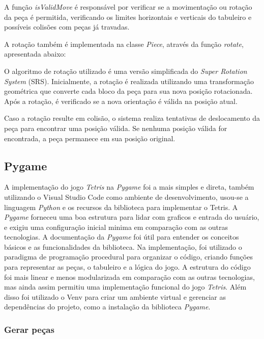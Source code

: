 A função \textit{isValidMove} é responsável por verificar se a movimentação ou rotação da peça é permitida, verificando os limites horizontais e verticais do tabuleiro e possíveis colisões com peças já travadas.

A rotação também é implementada na classe \textit{Piece}, através da função \textit{rotate}, apresentada abaixo:



O algoritmo de rotação utilizado é uma versão simplificada do \textit{Super Rotation System} (SRS). Inicialmente, a rotação é realizada utilizando uma transformação geométrica que converte cada bloco da peça para sua nova posição rotacionada. Após a rotação, é verificado se a nova orientação é válida na posição atual.

Caso a rotação resulte em colisão, o sistema realiza tentativas de deslocamento da peça para encontrar uma posição válida. Se nenhuma posição válida for encontrada, a peça permanece em sua posição original.


\subsection{Pygame}

A implementação do jogo \textit{Tetris} na \textit{Pygame} foi a mais simples e direta, também utilizando o Visual Studio Code como ambiente de desenvolvimento, usou-se a linguagem \textit{Python} e os recursos da biblioteca para implementar o Tetris. A \textit{Pygame} forneceu uma boa estrutura para lidar com graficos e entrada do usuário, e exigiu uma configuração inicial minima em comparação com as outras tecnologias. A documentação da \textit{Pygame} foi útil para entender os conceitos básicos e as funcionalidades da biblioteca.
Na implementação, foi utilizado o paradigma de programação procedural para organizar o código, criando funções para representar as peças, o tabuleiro e a lógica do jogo. A estrutura do código foi mais linear e menos modularizada em comparação com as outras tecnologias, mas ainda assim permitiu uma implementação funcional do jogo \textit{Tetris}.
Além disso foi utilizado o Venv para criar um ambiente virtual e gerenciar as dependências do projeto, como a instalação da biblioteca \textit{Pygame}.

\subsubsection{Gerar peças}

